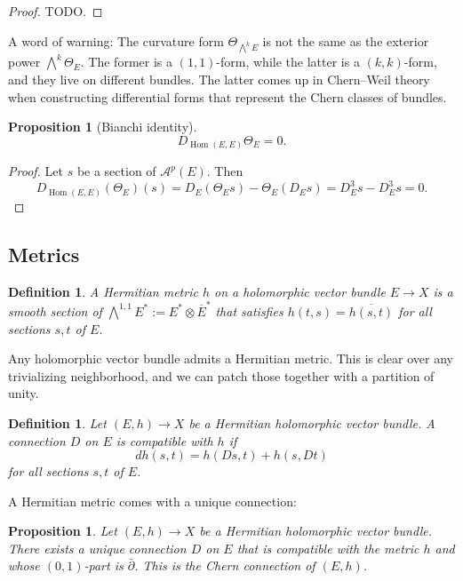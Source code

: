 \documentclass[11pt]{article}
\newtheorem{prop}[theo]{Proposition}
\newtheorem{defi}[theo]{Definition}
\newtheorem*{proof}{Proof}
\newcommand{\cc}[1]{\mathcal{#1}}
\DeclareMathOperator{\Hom}{Hom}
\begin{document}
\begin{proof}
  TODO.
\end{proof}


A word of warning: The curvature form $\Theta_{\bigwedge^kE}$ is not the same as the exterior power $\bigwedge^k \Theta_E$. The former is a $(1,1)$-form, while the latter is a $(k,k)$-form, and they live on different bundles. The latter comes up in Chern--Weil theory when constructing differential forms that represent the Chern classes of bundles.


\begin{prop}[Bianchi identity]
\[
D_{\Hom(E,E)} \Theta_E = 0.
\]
\end{prop}

\begin{proof}
Let $s$ be a section of $\cc A^p(E)$. Then
\[
D_{\Hom(E,E)}(\Theta_E)(s)
= D_E(\Theta_E s) - \Theta_E(D_E s)
= D_E^3 s - D_E^3 s = 0.
\]
\end{proof}


\subsection{Metrics}

\begin{defi}
A \emph{Hermitian metric} $h$ on a holomorphic vector bundle $E \to X$ is a smooth section of $\bigwedge^{1,1}E^* := E^* \otimes \overline E^*$ that satisfies $h(t, s) = \overline{h(s, t)}$ for all sections $s, t$ of $E$.
\end{defi}

Any holomorphic vector bundle admits a Hermitian metric. This is clear over any trivializing neighborhood, and we can patch those together with a partition of unity.


\begin{defi}
Let $(E, h) \to X$ be a Hermitian holomorphic vector bundle. A connection $D$ on $E$ is \emph{compatible} with $h$ if
$$
d h(s, t) = h(Ds, t) + h(s, Dt)
$$
for all sections $s, t$ of $E$.
\end{defi}

A Hermitian metric comes with a unique connection:


\begin{prop}
Let $(E, h) \to X$ be a Hermitian holomorphic vector bundle. There exists a unique connection $D$ on $E$ that is compatible with the metric $h$ and whose $(0,1)$-part is $\bar\partial$. This is the \emph{Chern} connection of $(E,h)$.
\end{prop}
\end{document}
